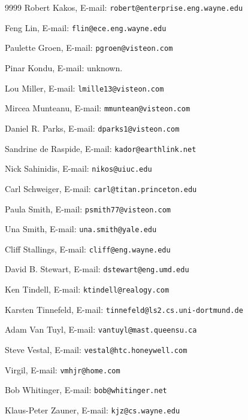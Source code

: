 \begin{thecustombibliography}{9999}
Robert Kakos,
E-mail: \texttt{robert@enterprise.eng.wayne.edu}

Feng Lin,
E-mail: \texttt{flin@ece.eng.wayne.edu}

Paulette Groen,
E-mail: \texttt{pgroen@visteon.com}

Pinar Kondu,
E-mail: unknown.

Lou Miller,
E-mail: \texttt{lmille13@visteon.com}

Mircea Munteanu,
E-mail: \texttt{mmuntean@visteon.com}

Daniel R. Parks,
E-mail: \texttt{dparks1@visteon.com}

Sandrine de Raspide,
E-mail: \texttt{kador@earthlink.net}

Nick Sahinidis,
E-mail: \texttt{nikos@uiuc.edu}

Carl Schweiger,
E-mail: \texttt{carl@titan.princeton.edu}

Paula Smith,
E-mail: \texttt{psmith77@visteon.com}

Una Smith,
E-mail: \texttt{una.smith@yale.edu}

Cliff Stallings,
E-mail: \texttt{cliff@eng.wayne.edu}

David B. Stewart,
E-mail: \texttt{dstewart@eng.umd.edu}

Ken Tindell,
E-mail: \texttt{ktindell@realogy.com}

Karsten Tinnefeld,
E-mail: \texttt{tinnefeld@ls2.cs.uni-dortmund.de}

Adam Van Tuyl,
E-mail: \texttt{vantuyl@mast.queensu.ca}

Steve Vestal,
E-mail: \texttt{vestal@htc.honeywell.com}

Virgil,
E-mail: \texttt{vmhjr@home.com}

Bob Whitinger,
E-mail: \texttt{bob@whitinger.net}

Klaus-Peter Zauner,
E-mail: \texttt{kjz@cs.wayne.edu}

\end{thecustombibliography}

